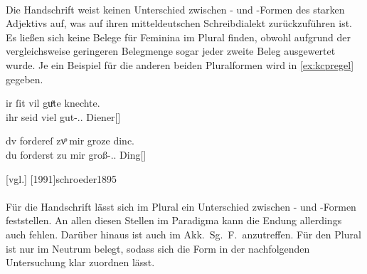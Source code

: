 \paragraph{\citet{kc:P}}
Die Handschrift \citet{kc:P} weist keinen Unterschied zwischen - und
-Formen des starken Adjektivs auf, was auf ihren mitteldeutschen
Schreibdialekt zurückzuführen ist. Es ließen sich keine Belege für Feminina im
Plural finden, obwohl aufgrund der vergleichsweise geringeren Belegmenge sogar
jeder zweite Beleg ausgewertet wurde. Je ein Beispiel für die anderen beiden
Pluralformen wird in \cref{ex:kcpregel} gegeben.

\begin{exe}
\ex \label{ex:kcpregel}
	\begin{xlist}
	\ex \label{ex:kcpregel_1}
		\gll ir ſit vil guͦte knechte. \\
			ihr seid viel gut-\Nom.\Pl.\St{} Diener[\MascM] \\
		\begin{taggedline}{\parencites%
			[\pno~45\ra, 26]{kc:P}[vgl.]%
			[\pno~16\rb, 18]{kc:B1}%
			[\pno~26\vb, 35]{kc:VB}%
		}
		\trans {}
		\end{taggedline}

	\ex \label{ex:kcpregel_2}
		\gll dv fordereſ zvͦ mir groze dinc. \\
			du forderst zu mir groß-\Acc.\Pl.\St{} Ding[\NeutI] \\
		\begin{taggedline}{\parencites%
			[\pno~19\ra, 10]{kc:P}[vgl.]%
			[1991]{schroeder1895}
		}
		\trans {}
		\end{taggedline}
	\end{xlist}
\end{exe}

\paragraph{\citet{kc:C1}}
Für die Handschrift \citet{kc:C1} lässt sich im Plural ein Unterschied zwischen
- und -Formen feststellen. An allen diesen Stellen im
Paradigma kann die Endung allerdings auch fehlen. Darüber hinaus ist
 auch im Akk.\ Sg.\ F.\ anzutreffen. Für den Plural ist 
nur im Neutrum belegt, sodass sich die Form   in der
nachfolgenden Untersuchung klar zuordnen lässt.

